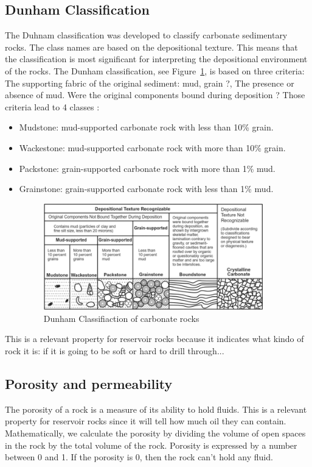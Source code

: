 \subsection{Dunham Classification}
The Duhnam classification was developed to classify carbonate sedimentary rocks. The class names are based on the depositional texture. This means that the classification is most significant for interpreting the depositional environment of the rocks. The Dunham classification, see Figure~\ref{fig:dunham}, is based on three criteria: The supporting fabric of the original sediment: mud, grain ?, The presence or absence of mud. Were the original components bound during deposition ?
Those criteria lead to 4 classes :
\begin{itemize}
    \item Mudstone: mud-supported carbonate rock with less than 10\% grain.
    \item Wackestone: mud-supported carbonate rock with more than 10\% grain.
    \item Packstone: grain-supported carbonate rock with more than 1\% mud.
    \item Grainstone: grain-supported carbonate rock with less than 1\% mud.
	\begin{figure}[!htp]
    \centering
        \includegraphics[width=0.9\textwidth]{./figures/02-Dunhams-classification}
        \caption{Dunham Classifiaction of carbonate rocks}\label{fig:dunham}
    \end{figure}
\end{itemize}
This is a relevant property for reservoir rocks because it indicates what kindo of rock it is: if it is going to be soft or hard to drill through...

\subsection{Porosity and permeability}
The porosity of a rock is a measure of its ability to hold fluids. This is a relevant property for reservoir rocks since it will tell how much oil they can contain. Mathematically,  we calculate the porosity by dividing the volume of open spaces in the rock by the total volume of the rock. Porosity is expressed by a number between 0 and 1. If the porosity is 0, then the rock can't hold any fluid. 
 
